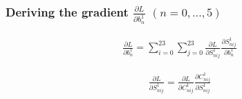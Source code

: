 \documentclass[a4paper,12pt]{article}
\begin{document}
\subsubsection{Deriving the gradient $\frac{\partial{L}}{\partial{b^1_n}}$ $(n = 0, ..., 5)$}
\begin{equation}
\begin{aligned}
\frac{\partial{L}}{\partial{b^1_{n}}} = \sum\limits_{i = 0}^{23}\sum\limits_{j = 0}^{23}\frac{\partial{L}}{\partial{S^1_{nij}}}\frac{\partial{S^1_{nij}}}{\partial{b^1_{n}}}\label{eq51}
\end{aligned}
\end{equation}

\begin{equation}
\begin{aligned}
\frac{\partial{L}}{\partial{S^1_{nij}}} = \frac{\partial{L}}{\partial{C^1_{nij}}}\frac{\partial{C^1_{nij}}}{\partial{S^1_{nij}}} \label{eq52}
\end{aligned}
\end{equation}
\end{document}
